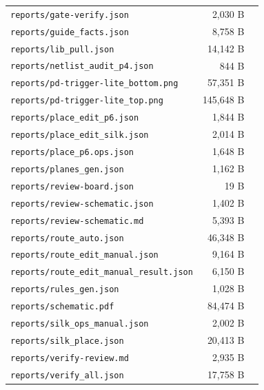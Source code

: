 \documentclass[11pt,a4paper]{article}
\begin{document}
{\begin{longtable}{p{9cm}rp{4cm}}
\texttt{reports/gate-verify.json} & 2,030 B &  \\
\texttt{reports/guide\_facts.json} & 8,758 B &  \\
\texttt{reports/lib\_pull.json} & 14,142 B &  \\
\texttt{reports/netlist\_audit\_p4.json} & 844 B &  \\
\texttt{reports/pd-trigger-lite\_bottom.png} & 57,351 B &  \\
\texttt{reports/pd-trigger-lite\_top.png} & 145,648 B &  \\
\texttt{reports/place\_edit\_p6.json} & 1,844 B &  \\
\texttt{reports/place\_edit\_silk.json} & 2,014 B &  \\
\texttt{reports/place\_p6.ops.json} & 1,648 B &  \\
\texttt{reports/planes\_gen.json} & 1,162 B &  \\
\texttt{reports/review-board.json} & 19 B &  \\
\texttt{reports/review-schematic.json} & 1,402 B &  \\
\texttt{reports/review-schematic.md} & 5,393 B &  \\
\texttt{reports/route\_auto.json} & 46,348 B &  \\
\texttt{reports/route\_edit\_manual.json} & 9,164 B &  \\
\texttt{reports/route\_edit\_manual\_result.json} & 6,150 B &  \\
\texttt{reports/rules\_gen.json} & 1,028 B &  \\
\texttt{reports/schematic.pdf} & 84,474 B &  \\
\texttt{reports/silk\_ops\_manual.json} & 2,002 B &  \\
\texttt{reports/silk\_place.json} & 20,413 B &  \\
\texttt{reports/verify-review.md} & 2,935 B &  \\
\texttt{reports/verify\_all.json} & 17,758 B &  \\
\bottomrule
\end{longtable}
}
\end{document}
